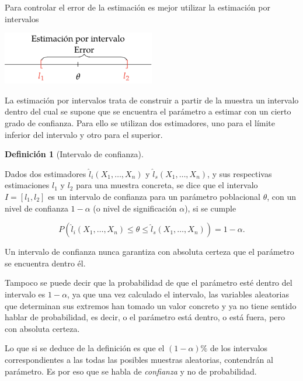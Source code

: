 \documentclass[
  a4paper,
]{scrreport}
\theoremstyle{plain}
\theoremstyle{definition}
\theoremstyle{definition}
\newtheorem{definition}{Definición}[chapter]
\theoremstyle{remark}
\begin{document}
Para controlar el error de la estimación es mejor utilizar la estimación
por intervalos

\begin{center}
\includegraphics[width=0.5\textwidth,height=\textheight]{img/estimacion/error-estimacion-intervalo.pdf}
\end{center}

La estimación por intervalos trata de construir a partir de la muestra
un intervalo dentro del cual se supone que se encuentra el parámetro a
estimar con un cierto grado de confianza. Para ello se utilizan dos
estimadores, uno para el límite inferior del intervalo y otro para el
superior.

\begin{definition}[Intervalo de
confianza]\protect\hypertarget{def-intervalo-confianza}{}\label{def-intervalo-confianza}

Dados dos estimadores \(\hat l_i(X_1,\ldots,X_n)\) y
\(\hat l_s(X_1,\ldots,X_n)\), y sus respectivas estimaciones \(l_1\) y
\(l_2\) para una muestra concreta, se dice que el intervalo
\(I=[l_1,l_2]\) es un intervalo de confianza para un parámetro
poblacional \(\theta\), con un nivel de confianza \(1-\alpha\) (o nivel
de significación \(\alpha\)), si se cumple

\[
P(\hat l_i(X_1,\ldots,X_n)\leq \theta \leq \hat l_s(X_1,\ldots,X_n))= 1-\alpha.
\]

\end{definition}

Un intervalo de confianza nunca garantiza con absoluta certeza que el
parámetro se encuentra dentro él.

Tampoco se puede decir que la probabilidad de que el parámetro esté
dentro del intervalo es \(1-\alpha\), ya que una vez calculado el
intervalo, las variables aleatorias que determinan sus extremos han
tomado un valor concreto y ya no tiene sentido hablar de probabilidad,
es decir, o el parámetro está dentro, o está fuera, pero con absoluta
certeza.

Lo que si se deduce de la definición es que el \((1-\alpha)\%\) de los
intervalos correspondientes a las todas las posibles muestras
aleatorias, contendrán al parámetro. Es por eso que se habla de
\emph{confianza} y no de probabilidad.
\end{document}
